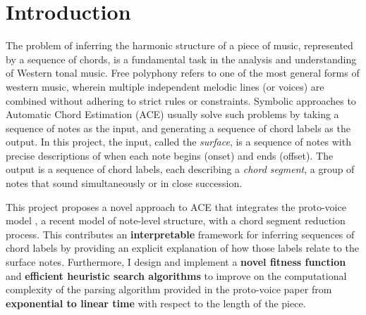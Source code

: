 \documentclass[12pt,a4paper,twoside,openany]{report} \usepackage[pdfborder={0 0 0}]{hyperref}    %
\theoremstyle{definition} \newtheorem{definition}{Definition}[section]
\begin{document}
    \chapter{Introduction}
    The problem of inferring the harmonic structure of a piece of music, represented by a sequence of chords, is
    a fundamental task in the analysis and understanding of Western tonal music. Free polyphony refers to one of the
    most general forms of western music, wherein multiple independent melodic lines (or voices) are combined without
    adhering to strict rules or constraints. 
    Symbolic approaches to Automatic Chord Estimation (ACE) usually solve such problems by taking a sequence of notes
    as the input, and generating a sequence of chord labels as the output.
    In this project, the input, called the \textit{surface}, is a sequence of notes with precise descriptions of when each note begins (onset) and ends (offset). 
    The output is a sequence of chord labels, each describing a \textit{chord segment}, a group of notes
    that sound simultaneously or in close succession. 


    This project proposes a novel approach to ACE that integrates the proto-voice model \cite{finkensiepModelingInferringProtovoice2021}, a recent model of note-level structure, 
    with a chord segment reduction process. This contributes an \textbf{interpretable} framework for
    inferring sequences of chord labels by providing an explicit explanation of how those labels relate to the
    surface notes. Furthermore, I design and implement a \textbf{novel fitness function} and \textbf{efficient
      heuristic search
    algorithms} to improve on the computational complexity of the parsing algorithm provided in the proto-voice paper
    \cite{finkensiepModelingInferringProtovoice2021} from \textbf{exponential to linear time} with respect to the length
    of the piece.
\end{document}
